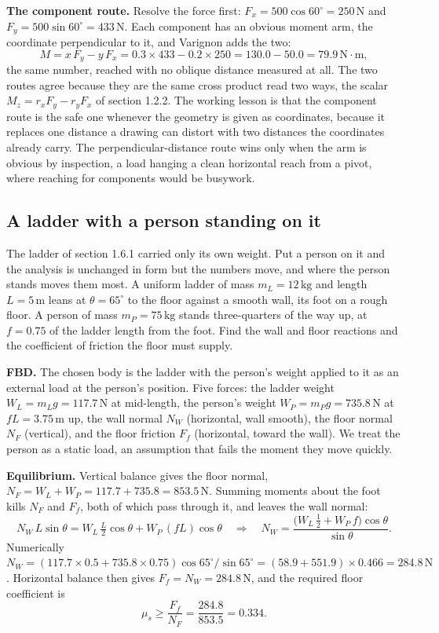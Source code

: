 \textbf{The component route.} Resolve the force first: $F_x = 500\cos 60^{\circ}
= 250\,\text{N}$ and $F_y = 500\sin 60^{\circ} = 433\,\text{N}$. Each component
has an obvious moment arm, the coordinate perpendicular to it, and Varignon adds
the two:
\[
M = x\,F_y - y\,F_x = 0.3 \times 433 - 0.2 \times 250 = 130.0 - 50.0
= 79.9\,\text{N}\cdot\text{m},
\]
the same number, reached with no oblique distance measured at all. The two
routes agree because they are the same cross product read two ways, the scalar
$M_z = r_x F_y - r_y F_x$ of section 1.2.2. The working lesson is that the
component route is the safe one whenever the geometry is given as coordinates,
because it replaces one distance a drawing can distort with two distances the
coordinates already carry. The perpendicular-distance route wins only when the
arm is obvious by inspection, a load hanging a clean horizontal reach from a
pivot, where reaching for components would be busywork.

\subsection{A ladder with a person standing on it}

The ladder of section 1.6.1 carried only its own weight. Put a person on it and
the analysis is unchanged in form but the numbers move, and where the person
stands moves them most. A uniform ladder of mass $m_L = 12\,\si{\kilogram}$ and
length $L = 5\,\si{\meter}$ leans at $\theta = 65^{\circ}$ to the floor against a
smooth wall, its foot on a rough floor. A person of mass $m_P = 75\,\si{
\kilogram}$ stands three-quarters of the way up, at $f = 0.75$ of the ladder
length from the foot. Find the wall and floor reactions and the coefficient of
friction the floor must supply.

\textbf{FBD.} The chosen body is the ladder with the person's weight applied to
it as an external load at the person's position. Five forces: the ladder weight
$W_L = m_L g = 117.7\,\text{N}$ at mid-length, the person's weight $W_P = m_P g =
735.8\,\text{N}$ at $f L = 3.75\,\si{\meter}$ up, the wall normal $N_W$
(horizontal, wall smooth), the floor normal $N_F$ (vertical), and the floor
friction $F_f$ (horizontal, toward the wall). We treat the person as a static
load, an assumption that fails the moment they move quickly.

\textbf{Equilibrium.} Vertical balance gives the floor normal, $N_F = W_L + W_P
= 117.7 + 735.8 = 853.5\,\text{N}$. Summing moments about the foot kills $N_F$
and $F_f$, both of which pass through it, and leaves the wall normal:
\[
N_W\,L\sin\theta = W_L\,\tfrac{L}{2}\cos\theta + W_P\,(fL)\cos\theta
\quad\Longrightarrow\quad
N_W = \frac{\big(W_L\,\tfrac{1}{2} + W_P\,f\big)\cos\theta}{\sin\theta}.
\]
Numerically $N_W = (117.7 \times 0.5 + 735.8 \times 0.75)\cos 65^{\circ}/\sin
65^{\circ} = (58.9 + 551.9)\times 0.466 = 284.8\,\text{N}$. Horizontal balance
then gives $F_f = N_W = 284.8\,\text{N}$, and the required floor coefficient is
\[
\mu_s \ge \frac{F_f}{N_F} = \frac{284.8}{853.5} = 0.334.
\]

